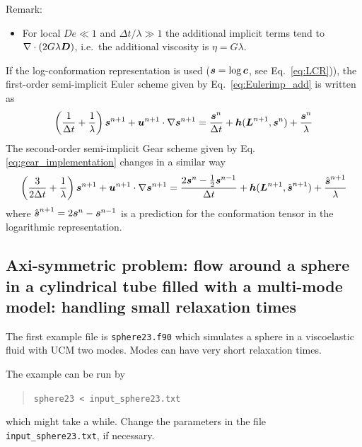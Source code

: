 \newpage
\noindent
Remark:
\begin{itemize}
  \item For local $De\ll1$ and $\Delta t/\lambda\gg1$ the additional implicit
terms tend to $\nabla\cdot(2G\lambda\boldsymbol{D})$, i.e.\ the
additional viscosity is $\eta=G\lambda$.
\end{itemize}
If the log-conformation representation is used ($\boldsymbol{s} = \log \boldsymbol{c}$, see
Eq.~\eqref{eq:LCR})), the 
first-order semi-implicit Euler scheme given by
Eq.~\eqref{eq:Eulerimp_add} is written as
\begin{equation}
  \left(\frac{1}{\Delta t}+\frac{1}{\lambda}\right)\boldsymbol{s}^{n+1}+
  \boldsymbol{u}^{n+1}\cdot\nabla\boldsymbol{s}^{n+1}=
     \frac{\boldsymbol{s}^n}{\Delta t}+
      \boldsymbol{h}(\boldsymbol{L}^{n+1},\boldsymbol{s}^n) +
     \frac{\boldsymbol{s}^n}{\lambda}
\end{equation}
The second-order semi-implicit Gear scheme given by 
Eq.\eqref{eq:gear_implementation} changes in a similar way
\begin{equation}
 \left(\frac{3}{2\Delta t}+\frac{1}{\lambda}\right)\boldsymbol{s}^{n+1} +
   {\boldsymbol{u}}^{n+1}\cdot\nabla\boldsymbol{s}^{n+1}=
  \frac{2\boldsymbol{s}^{n}-\frac12\boldsymbol{s}^{n-1}}{\Delta t} +
    \boldsymbol{h}(\boldsymbol{L}^{n+1},\hat{\boldsymbol{s}}^{n+1}) +
       \frac{\hat{\boldsymbol{s}}^{n+1}}{\lambda}
\end{equation}
where $\hat{\boldsymbol{s}}^{n+1}=2\boldsymbol{s}^n-\boldsymbol{s}^{n-1}$ is a prediction for the 
conformation tensor in the logarithmic representation.

\subsection{Axi-symmetric problem: flow around a sphere in
 a cylindrical tube filled with a multi-mode model: handling 
 small relaxation times}
\label{sec:sphere_small_lambda}

The first example file is \texttt{sphere23.f90} which simulates a sphere in a
viscoelastic fluid with UCM two modes. Modes can have very short
relaxation times.

The example can be run by
\begin{quote}
   \texttt{sphere23 < input\_sphere23.txt}
\end{quote}
which might take a while. Change the parameters in the file
\texttt{input\_sphere23.txt}, if necessary.

